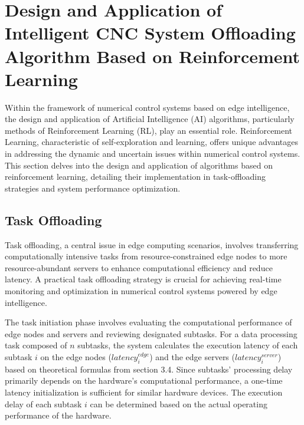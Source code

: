 \documentclass[preprint,12pt,authoryear]{elsarticle}
\begin{document}
\section{Design and Application of Intelligent CNC System Offloading Algorithm Based on Reinforcement Learning }

Within the framework of numerical control systems based on edge intelligence, the design and application of Artificial Intelligence (AI) algorithms, particularly methods of Reinforcement Learning (RL), play an essential role. Reinforcement Learning, characteristic of self-exploration and learning, offers unique advantages in addressing the dynamic and uncertain issues within numerical control systems. This section delves into the design and application of algorithms based on reinforcement learning, detailing their implementation in task-offloading strategies and system performance optimization.

\subsection{Task Offloading}

Task offloading, a central issue in edge computing scenarios, involves transferring computationally intensive tasks from resource-constrained edge nodes to more resource-abundant servers to enhance computational efficiency and reduce latency. A practical task offloading strategy is crucial for achieving real-time monitoring and optimization in numerical control systems powered by edge intelligence.

The task initiation phase involves evaluating the computational performance of edge nodes and servers and reviewing designated subtasks. For a data processing task composed of \(n\) subtasks, the system calculates the execution latency of each subtask \(i\) on the edge nodes (\(latency_i^{edge}\)) and the edge servers (\(latency_i^{server}\)) based on theoretical formulas from section 3.4. Since subtasks' processing delay primarily depends on the hardware's computational performance, a one-time latency initialization is sufficient for similar hardware devices. The execution delay of each subtask \(i\) can be determined based on the actual operating performance of the hardware.
\end{document}
